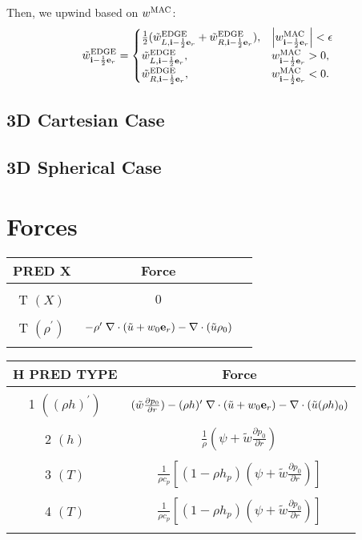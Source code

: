 \documentclass[11pt]{article}
\def\half  {\frac{1}{2}}
\def\edge  {\rm EDGE}
\def\mac   {\rm MAC}
\def\eb    {{\bf e}}
\def\ib    {{\bf i}}
\def\ut    {\tilde{u}}
\def\wt    {\tilde{w}}
\begin{document}
Then, we upwind based on $w^{\mac}$:
\begin{equation}
\wt_{\ib-\half\eb_r}^{\edge} =
\begin{cases}
\half(\wt_{L,\ib-\half\eb_r}^{\edge} + \wt_{R,\ib-\half\eb_r}^{\edge}), & \left|w^{\mac}_{\ib-\half\eb_r}\right| < \epsilon \\
\wt_{L,\ib-\half\eb_r}^{\edge}, & w^{\mac}_{\ib-\half\eb_r} > 0, \\
\wt_{R,\ib-\half\eb_r}^{\edge}, & w^{\mac}_{\ib-\half\eb_r} < 0.
\end{cases}
\end{equation}
\subsection{3D Cartesian Case}
\subsection{3D Spherical Case}
\cleardoublepage
\section{Forces}
\begin{table*}
\begin{center}
\caption{Forcing term into make edge scal \newline}
\begin{tabular}{|c|c|c|}
\multicolumn{1}{c}{PRED X}   & \multicolumn{1}{c}{Force} \\
\hline
  &   \\
T $(X)$ & $0$ \\
  &   \\
T $(\rho^\prime)$ & $-\rho^\prime \; \nabla \cdot (\ut+w_0 \eb_r) - \nabla \cdot (\ut \rho_0) $  \\
  &   \\
\hline
\end{tabular}
\end{center}
\begin{center}
\begin{tabular}{|c|c|}
\multicolumn{1}{c}{H PRED TYPE}   & \multicolumn{1}{c}{Force} \\
\hline
   & \\
 1 $((\rho h)^\prime)$ &  $(\tilde{w} \frac{\partial p_0}{\partial r}) - (\rho h)^\prime \; \nabla \cdot (\ut+w_0 \eb_r) - \nabla \cdot (\ut (\rho h)_0) $  \\
   & \\
 2 $(h)$ & $\frac{1}{\rho} (\psi + \tilde{w} \frac{\partial p_0}{\partial r})$  \\
   & \\
 3 $(T)$ & $\frac{1}{\rho c_p} \left[ (1 - \rho h_p) (\psi + \tilde{w} \frac{\partial p_0}{\partial r}) \right]$ \\
   & \\
 4 $(T)$ & $\frac{1}{\rho c_p} \left[ (1 - \rho h_p) (\psi + \tilde{w} \frac{\partial p_0}{\partial r}) \right]$ \\
   & \\
\hline
\end{tabular}
\end{center}
\end{table*}
\end{document}

